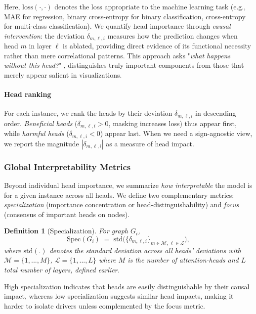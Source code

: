 \documentclass[lettersize,journal]{IEEEtran}
\newtheorem{definition}{Definition}
\begin{document}
Here, $\mathrm{loss}(\cdot,\cdot)$ denotes the loss appropriate to the machine learning task (e.g., MAE for regression, binary cross-entropy for binary classification, cross-entropy for multi-class classification). We quantify head importance through \textit{causal intervention}: the deviation $\delta_{m,\ell,i}$ measures how the prediction changes when head $m$ in layer $\ell$ is ablated, providing direct evidence of its functional necessity rather than mere correlational patterns. This approach asks "\textit{what happens without this head?}" , distinguishes truly important components from those that merely appear salient in visualizations.


\paragraph{Head ranking}
For each instance, we rank the heads by their deviation $\delta_{m,\ell,i}$ in descending order. 
\emph{Beneficial heads} ($\delta_{m,\ell,i}>0$, masking increases loss) thus appear first, while \emph{harmful heads} ($\delta_{m,\ell,i}<0$) appear last. 
When we need a sign-agnostic view, we report the magnitude $|\delta_{m,\ell,i}|$ as a measure of head impact.


\subsubsection{Global Interpretability Metrics}
Beyond individual head importance, we summarize \emph{how interpretable} the model is for a given instance across all heads. We define two complementary metrics: \textit{specialization} (importance concentration or head-distinguishability) and \textit{focus} (consensus of important heads on nodes).

\begin{definition}[Specialization]
For graph $G_i$,
\begin{equation}
\mathrm{Spec}(G_i) \;=\; \mathrm{std}\Big(\{\delta_{m,\ell,i}\}_{m \in \mathcal{M},\, \ell \in \mathcal{L}}\Big),
\end{equation}
where $\mathrm{std}(.)$ denotes the standard deviation across all heads' deviations with $\mathcal{M} = \{1, . . ., M\}$, $\mathcal{L} = \{1, . . .,L\}$ where $M$ is the number of attention-heads and $L$ total number of layers, defined earlier.

\end{definition}

High specialization indicates that heads are easily distinguishable by their causal impact, whereas low specialization suggests similar head impacts, making it harder to isolate drivers unless complemented by the focus metric.
\end{document}
